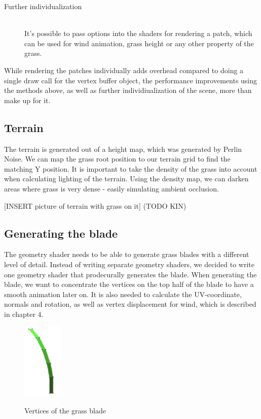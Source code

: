 \documentclass[conference]{acmsiggraph}
\begin{document}
\begin{description}
  \item[Further individualization] \hfill \\
	It's possible to pass options into the shaders for rendering a patch, which can be used for wind animation, grass height or any other property of the grass.
\end{description}

While rendering the patches individually adds overhead compared to doing a single draw call for the vertex buffer object, the performance improvements using the methods above, as well as further individiualization of the scene, more than make up for it.

\subsection{Terrain}
The terrain is generated out of a height map, which was generated by Perlin Noise. We can map the grass root position to our terrain grid to find the matching Y position. It is important to take the density of the grass into account when calculating lighting of the terrain. Using the density map, we can darken areas where grass is very dense - easily simulating ambient occlusion.

[INSERT picture of terrain with grass on it] (TODO KIN)

\subsection{Generating the blade}
The geometry shader needs to be able to generate grass blades with a different level of detail. Instead of writing separate geometry shaders, we decided to write one geometry shader that prodecurally generates the blade. When generating the blade, we want to concentrate the vertices on the top half of the blade to have a smooth animation later on. It is also needed to calculate the UV-coordinate, normals and rotation, as well as vertex displacement for wind, which is described in chapter 4.

 \begin{figure}[ht]
   \centering
   \includegraphics[width=0.75in]{images/grass_blade_vertices}
   \caption{Vertices of the grass blade} \cite{EddieLee}
 \end{figure}
\end{document}
